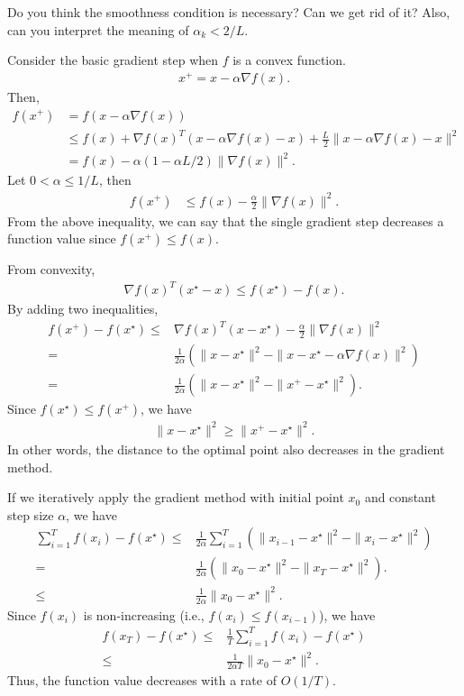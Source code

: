 \documentclass{article}
\begin{document}
\begin{exercise}
    Do you think the smoothness condition is necessary? Can we get rid of it?
    Also, can you interpret the meaning of $\alpha_k < 2/L$.
\end{exercise}

Consider the basic gradient step when $f$ is a convex function.
\begin{align}
    x^+ = x - \alpha \nabla f(x).
\end{align}
Then,
\begin{align}
    f(x^+) &= f(x-\alpha \nabla f(x)) \\
    &\leq f(x) +\nabla f(x)^T (x-\alpha \nabla f(x) - x) + \frac{L}{2} \|x-\alpha \nabla f(x) - x\|^2\\
    &= f(x) -\alpha (1- \alpha L/2) \|\nabla f(x)\|^2.
\end{align}
Let $0<\alpha \leq 1/L$, then
\begin{align}
    f(x^+) &\leq f(x) -\frac{\alpha}{2}  \|\nabla f(x)\|^2.
\end{align}
From the above inequality, we can say that the single gradient step decreases a function value since $f(x^+)\leq f(x)$.

From convexity,
\begin{align}
    \nabla f(x)^T (x^\star-x) \leq f(x^\star)-f(x).
\end{align}
By adding two inequalities,
\begin{align}
    f(x^+) - f(x^\star) \leq& \nabla f(x)^T (x- x^\star) -\frac{\alpha}{2} \|\nabla f(x)\|^2\\
    =&\frac{1}{2\alpha} \left(\|x-x^\star\|^2 - \|x-x^\star - \alpha \nabla f(x)\|^2\right)\\
    =&\frac{1}{2\alpha} \left(\|x-x^\star\|^2 - \|x^+-x^\star\|^2\right).
\end{align}
Since $f(x^\star) \leq f(x^+)$, we have
\begin{align}
    \|x-x^\star\|^2 \geq \|x^+-x^\star\|^2.
\end{align}
In other words, the distance to the optimal point also decreases in the gradient method.

If we iteratively apply the gradient method with initial point $x_0$ and constant step size $\alpha$, we have
\begin{align}
    \sum_{i=1}^T f(x_i) - f(x^\star) \leq& \frac{1}{2\alpha} \sum_{i=1}^T \left(\|x_{i-1}-x^\star\|^2 - \|x_i-x^\star\|^2\right)\\
    =& \frac{1}{2\alpha} (\|x_0-x^\star\|^2 - \|x_T - x^\star\|^2).\\
    \leq& \frac{1}{2\alpha} \|x_0-x^\star\|^2.
\end{align}
Since $f(x_i)$ is non-increasing (i.e., $f(x_i)\leq f(x_{i-1})$), we have
\begin{align}
    f(x_T)-f(x^\star) \leq& \frac{1}{T} \sum_{i=1}^T f(x_i) - f(x^\star) \\
    \leq& \frac{1}{2\alpha T} \|x_0 - x^\star\|^2.
\end{align}
Thus, the function value decreases with a rate of $O(1/T)$.
\end{document}
